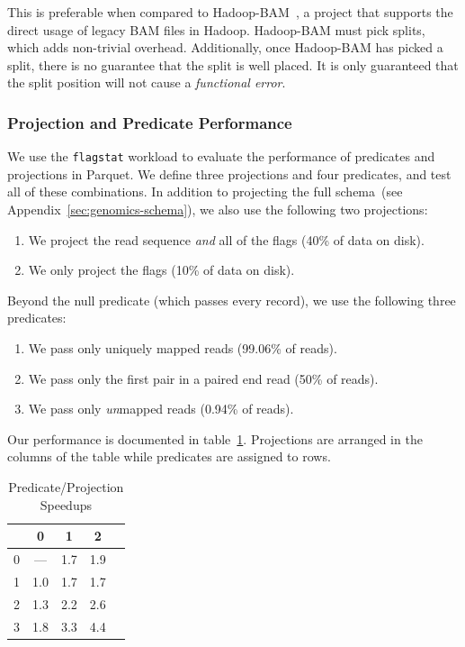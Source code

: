 \documentclass{acm_proc_article-sp}
\begin{document}
This is preferable when compared to Hadoop-BAM~\cite{niemenmaa12}, a project that supports the direct usage
of legacy BAM files in Hadoop. Hadoop-BAM must pick splits, which adds non-trivial overhead. Additionally, once
Hadoop-BAM has picked a split, there is no guarantee that the split is well placed. It is only guaranteed that the
split position will not cause a \emph{functional error}.

\subsubsection{Projection and Predicate Performance}
\label{sec:projection-predicate-performance}

We use the \texttt{flagstat} workload to evaluate the performance of predicates and projections in Parquet.
We define three projections and four predicates, and test all of these combinations. In addition to projecting the
full schema~(see Appendix~\ref{sec:genomics-schema}), we also use the following two projections:

\begin{enumerate}
\item We project the read sequence \emph{and} all of the flags (40\% of data on disk).
\item We only project the flags (10\% of data on disk).
\end{enumerate}

Beyond the null predicate (which passes every record), we use the following three predicates:

\begin{enumerate}
\item We pass only uniquely mapped reads (99.06\% of reads).
\item We pass only the first pair in a paired end read (50\% of reads).
\item We pass only \emph{un}mapped reads (0.94\% of reads).
\end{enumerate}

Our performance is documented in table~\ref{tab:ppp}. Projections are arranged in the columns of the table
while predicates are assigned to rows.

\begin{table}[h]
\caption{Predicate/Projection Speedups}
\label{tab:ppp}
\begin{center}
\begin{tabular}{ l | c c c c }
\hline
& 0 & 1 & 2 \\
\hline
\hline
0 & --- & 1.7 & 1.9 \\
1 & 1.0 & 1.7 & 1.7 \\
2 & 1.3 & 2.2 & 2.6 \\
3 & 1.8 & 3.3 & 4.4 \\
\hline
\end{tabular}
\end{center}
\end{table}
\end{document}
